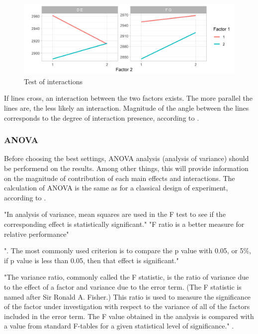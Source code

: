
\begin{figure}[ht] 
	\label{figure:taguchi:test_of_interaction}
	\includegraphics[width=1\linewidth]{simulations/taguchi/plots/test_of_interaction}
	\caption{Test of interactions}
\end{figure}

If lines cross, an interaction between the two factors exists. The more parallel the lines are, the less likely an interaction. Magnitude of the angle between the lines corresponds to the degree of interaction presence, according to \cite{roy_primer_1990}.

\subsubsection{ANOVA}
Before choosing the best settings, ANOVA analysis (analysis of variance) should be performend on the results. Among other things, this will provide information on the magnitude of contribution of each main effects and interactions. The calculation of ANOVA is the same as for a classical design of experiment, according to \cite{yang_design_2009}.


"In analysis of variance, mean squares are used in the F test to see if the corresponding effect is statistically significant."\cite{yang_design_2009}
"F ratio is a better measure for relative performance"\cite{yang_design_2009}

". The most commonly used criterion is to compare the p value with 0.05, or 5\%, if p value is less than 0.05, then that effect is significant."\cite{yang_design_2009}

"The variance ratio, commonly called the F statistic, is the ratio of variance due to the effect of a factor and variance due to the error term. (The F statistic is named after Sir Ronald A. Fisher.) This ratio is used to measure the significance of the factor under investigation with respect to the variance of all of the factors included in the error term. The F value obtained in the analysis is compared with a value from standard F-tables for a given statistical level of significance." \cite{roy_primer_1990}.



